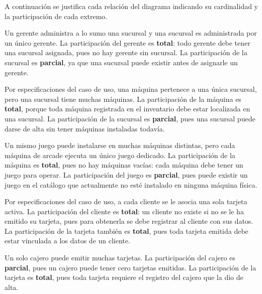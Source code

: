 \documentclass[11pt,letterpaper,spanish]{article}
\begin{document}
A continuación se justifica cada relación del diagrama indicando su cardinalidad y la
participación de cada extremo.

\begin{description}[leftmargin=0pt, style=nextline]

	\item[ADMINISTRAR --- Gerente $\leftrightarrow$ Sucursal \textnormal{(1:1)}]
		Un gerente administra a lo sumo una sucursal y una sucursal es administrada por un
		único gerente. La participación del gerente es \textbf{total}: todo gerente debe
		tener una sucursal asignada, pues no hay gerente sin sucursal. La participación de
		la sucursal es \textbf{parcial}, ya que una sucursal puede existir antes de
		asignarle un gerente.

	\item[PERTENECE --- Máquina $\leftrightarrow$ Sucursal \textnormal{(N:1)}]
		Por especificaciones del caso de uso, una máquina pertenece a una única sucursal,
		pero una sucursal tiene muchas máquinas. La participación de la máquina es
		\textbf{total}, porque toda máquina registrada en el inventario debe estar
		localizada en una sucursal. La participación de la sucursal es \textbf{parcial},
		pues una sucursal puede darse de alta sin tener máquinas instaladas todavía.

	\item[CONTENER --- Máquina $\leftrightarrow$ Juego \textnormal{(N:1)}]
		Un mismo juego puede instalarse en muchas máquinas distintas, pero cada máquina de
		arcade ejecuta un único juego dedicado. La participación de la máquina es
		\textbf{total}, pues no hay máquinas vacías: cada máquina debe tener un juego para
		operar. La participación del juego es \textbf{parcial}, pues puede existir un juego
		en el catálogo que actualmente no esté instalado en ninguna máquina física.

	\item[TENER --- Cliente $\leftrightarrow$ Tarjeta \textnormal{(1:1)}]
		Por especificaciones del caso de uso, a cada cliente se le asocia una sola tarjeta
		activa. La participación del cliente es \textbf{total}: un cliente no existe si no
		se le ha emitido su tarjeta, pues para obtenerla se debe registrar al cliente con
		sus datos. La participación de la tarjeta también es \textbf{total}, pues toda
		tarjeta emitida debe estar vinculada a los datos de un cliente.

	\item[EMITIR --- Cajero $\leftrightarrow$ Tarjeta \textnormal{(1:N)}]
		Un solo cajero puede emitir muchas tarjetas. La participación del cajero es
		\textbf{parcial}, pues un cajero puede tener cero tarjetas emitidas. La
		participación de la tarjeta es \textbf{total}, pues toda tarjeta requiere el
		registro del cajero que la dio de alta.


\end{description}
\end{document}
